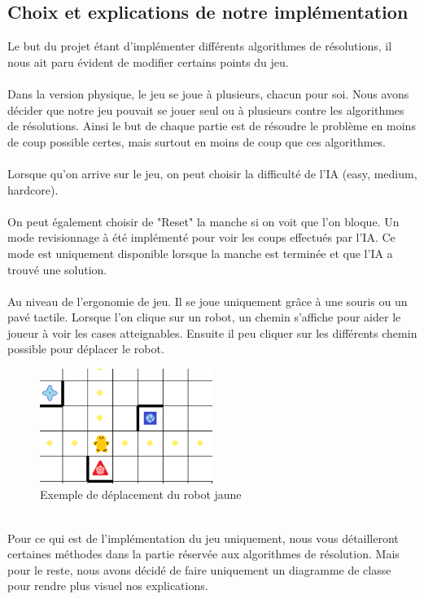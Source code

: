 \documentclass{article}
\begin{document}
\subsection{Choix et explications de notre implémentation}
Le but du projet étant d'implémenter différents algorithmes de résolutions, il nous ait paru évident de modifier certains points du jeu.\\\\Dans la version physique, le jeu se joue à plusieurs, chacun pour soi. Nous avons décider que notre jeu pouvait se jouer seul ou à plusieurs contre les algorithmes de résolutions. Ainsi le but de chaque partie est de résoudre le problème en moins de coup possible certes, mais surtout en moins de coup que ces algorithmes.\\\\Lorsque qu'on arrive sur le jeu, on peut choisir la difficulté de l'IA (easy, medium, hardcore).\\\\On peut également choisir de "Reset" la manche si on voit que l'on bloque. Un mode revisionnage à été implémenté pour voir les coups effectués par l'IA. Ce mode est uniquement disponible lorsque la manche est terminée et que l'IA a trouvé une solution.\\\\
Au niveau de l'ergonomie de jeu. Il se joue uniquement grâce à une souris ou un pavé tactile. Lorsque l'on clique sur un robot, un chemin s'affiche pour aider le joueur à voir les cases atteignables. Ensuite il peu cliquer sur les différents chemin possible pour déplacer le robot. 
\begin{figure}[h]
  \centering  
  \includegraphics[width=0.5\textwidth]{deplacement.png}  
  \caption{Exemple de déplacement du robot jaune} 
  \label{fig:Plateau}  
\end{figure}\\
Pour ce qui est de l'implémentation du jeu uniquement, nous vous détailleront certaines méthodes dans la partie réservée aux algorithmes de résolution. Mais pour le reste, nous avons décidé de faire uniquement un diagramme de classe pour rendre plus visuel nos explications.
\end{document}
